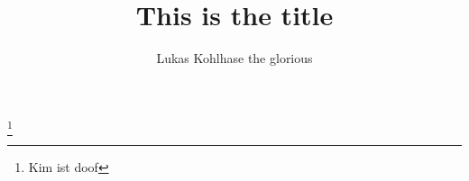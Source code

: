 \documentclass{article}
\title{This is the title}
\author{Lukas Kohlhase the glorious}
\begin{document}
\maketitle
\cite{book1} \cite{book2} \cite{book1,book2} \footnote{Kim ist doof}

\end{document}
